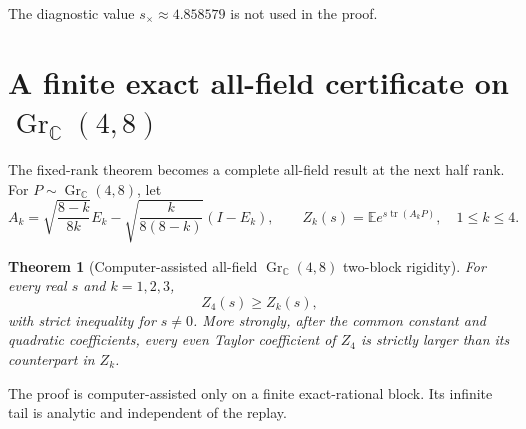 \documentclass[11pt]{article}
\newtheorem{theorem}{Theorem}[section]
\newcommand{\E}{\mathbb E}
\newcommand{\C}{\mathbb C}
\newcommand{\tr}{\operatorname{tr}}
\newcommand{\Gr}{\operatorname{Gr}}
\begin{document}
The diagnostic value $s_\times\approx4.858579$ is not used in the proof.

\section{A finite exact all-field certificate on \texorpdfstring{$\Gr_{\C}(4,8)$}{GrC(4,8)}}

The fixed-rank theorem becomes a complete all-field result at the next half
rank.  For $P\sim\Gr_{\C}(4,8)$, let
\begin{equation}
 A_k=\sqrt{\frac{8-k}{8k}}E_k
     -\sqrt{\frac{k}{8(8-k)}}(I-E_k),\qquad
 Z_k(s)=\E e^{s\tr(A_kP)},\quad 1\le k\le4.                \tag{8.1}
\end{equation}

\begin{theorem}[Computer-assisted all-field $\Gr_{\C}(4,8)$ two-block
rigidity]\label{thm:gr48}
For every real $s$ and $k=1,2,3$,
\begin{equation}
 Z_4(s)\ge Z_k(s),                                         \tag{8.2}
\end{equation}
with strict inequality for $s\ne0$.  More strongly, after the common
constant and quadratic coefficients, every even Taylor coefficient of
$Z_4$ is strictly larger than its counterpart in $Z_k$.
\end{theorem}

The proof is computer-assisted only on a finite exact-rational block.  Its
infinite tail is analytic and independent of the replay.
\end{document}
